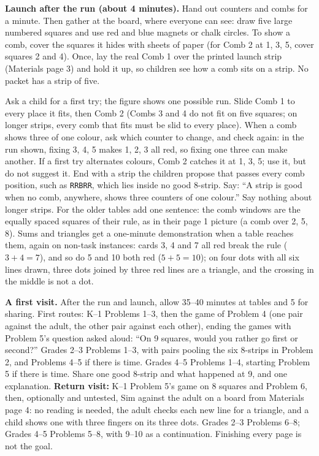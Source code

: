 \documentclass[11pt]{article}
\newcommand{\st}[1]{\texttt{#1}}
\begin{document}
\textbf{Launch after the run (about 4 minutes).} Hand out counters and combs for a minute. Then gather at the board, where everyone can see: draw five large numbered squares and use red and blue magnets or chalk circles. To show a comb, cover the squares it hides with sheets of paper (for Comb 2 at 1, 3, 5, cover squares 2 and 4). Once, lay the real Comb 1 over the printed launch strip (Materials page 3) and hold it up, so children see how a comb sits on a strip. No packet has a strip of five.
\begin{center}\launchfig\end{center}
Ask a child for a first try; the figure shows one possible run. Slide Comb 1 to every place it fits, then Comb 2 (Combs 3 and 4 do not fit on five squares; on longer strips, every comb that fits must be slid to every place). When a comb shows three of one colour, ask which counter to change, and check again: in the run shown, fixing 3, 4, 5 makes 1, 2, 3 all red, so fixing one three can make another. If a first try alternates colours, Comb 2 catches it at 1, 3, 5; use it, but do not suggest it. End with a strip the children propose that passes every comb position, such as \st{RRBRR}, which lies inside no good 8-strip. Say: ``A strip is good when no comb, anywhere, shows three counters of one colour.'' Say nothing about longer strips. For the older tables add one sentence: the comb windows are the equally spaced squares of their rule, as in their page 1 picture (a comb over 2, 5, 8). Sums and triangles get a one-minute demonstration when a table reaches them, again on non-task instances: cards 3, 4 and 7 all red break the rule ($3+4=7$), and so do 5 and 10 both red ($5+5=10$); on four dots with all six lines drawn, three dots joined by three red lines are a triangle, and the crossing in the middle is not a dot.

\textbf{A first visit.} After the run and launch, allow 35--40 minutes at tables and 5 for sharing. First routes: K--1 Problems 1--3, then the game of Problem 4 (one pair against the adult, the other pair against each other), ending the games with Problem 5's question asked aloud: ``On 9 squares, would you rather go first or second?'' Grades 2--3 Problems 1--3, with pairs pooling the six 8-strips in Problem 2, and Problems 4--5 if there is time. Grades 4--5 Problems 1--4, starting Problem 5 if there is time. Share one good 8-strip and what happened at 9, and one explanation. \textbf{Return visit:} K--1 Problem 5's game on 8 squares and Problem 6, then, optionally and untested, Sim against the adult on a board from Materials page 4: no reading is needed, the adult checks each new line for a triangle, and a child shows one with three fingers on its three dots. Grades 2--3 Problems 6--8; Grades 4--5 Problems 5--8, with 9--10 as a continuation. Finishing every page is not the goal.
\end{document}
